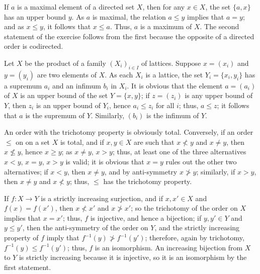 \documentclass{article}
\begin{document}
\begin{solution}[\ref{exe:swjbrepg}]
  \label{sol:pcqde5hb}
  If \(a\) is a maximal element of a directed set \(X\), then for any
  \(x \in X\), the set \(\{ a, x \}\) has an upper bound \(y\).  As
  \(a\) is maximal, the relation \(a \leq y\) implies that \(a = y\);
  and as \(x \leq y\), it follows that \(x \leq a\).  Thus, \(a\) is a
  maximum of \(X\).  The second statement of the exercise follows from
  the first because the opposite of a directed order is codirected.
\end{solution}

\begin{solution}[\ref{exe:yowl3axc}]
  \label{sol:rfwhck5v}
  Let \(X\) be the product of a family \((X_i)_{i \in I}\) of
  lattices.  Suppose \(x = (x_i)\) and \(y = (y_i)\) are two elements
  of \(X\).  As each \(X_i\) is a lattice, the set
  \(Y_i = \{ x_i, y_i \}\) has a supremum \(a_i\) and an infimum
  \(b_i\) in \(X_i\).  It is obvious that the element \(a = (a_i)\) of
  \(X\) is an upper bound of the set \(Y = \{ x, y \}\); if
  \(z = (z_i)\) is any upper bound of \(Y\), then \(z_i\) is an upper
  bound of \(Y_i\), hence \(a_i \leq z_i\) for all \(i\); thus,
  \(a \leq z\); it follows that \(a\) is the supremum of \(Y\).
  Similarly, \((b_i)\) is the infimum of \(Y\).
\end{solution}

\begin{solution}[\ref{exe:4knqif5b}]
  \label{sol:ien6orgc}
  An order with the trichotomy property is obviously total.
  Conversely, if an order \(\leq\) on on a set \(X\) is total, and if
  \(x,y \in X\) are such that \(x \nless y\) and \(x \neq y\), then
  \(x \nleq y\), hence \(x \geq y\); as \(x \neq y\), \(x > y\); thus,
  at least one of the three alternatives \(x < y\), \(x = y\),
  \(x > y\) is valid; it is obvious that \(x = y\) rules out the other
  two alternatives; if \(x < y\), then \(x \neq y\), and by
  anti-symmetry \(x \ngtr y\); similarly, if \(x > y\), then
  \(x \neq y\) and \(x \nless y\); thus, \(\leq\) has the trichotomy
  property.
\end{solution}

\begin{solution}[\ref{exe:v1tw1ijd}]
  \label{sol:rd6deawb}
  If \(f : X \to Y\) is a strictly increasing surjection, and if
  \(x, x' \in X\) and \(f(x) = f(x')\), then \(x \nless x'\) and
  \(x \ngtr x'\); so the trichotomy of the order on \(X\) implies that
  \(x = x'\); thus, \(f\) is injective, and hence a bijection; if
  \(y, y' \in Y\) and \(y \leq y'\), then the anti-symmetry of the
  order on \(Y\), and the strictly increasing property of \(f\) imply
  that \(f^{-1}(y) \ngtr f^{-1}(y')\); therefore, again by trichotomy,
  \(f^{-1}(y) \leq f^{-1}(y')\); thus, \(f\) is an isomorphism.  An
  increasing bijection from \(X\) to \(Y\) is strictly increasing
  because it is injective, so it is an isomorphism by the first
  statement.
\end{solution}
\end{document}
